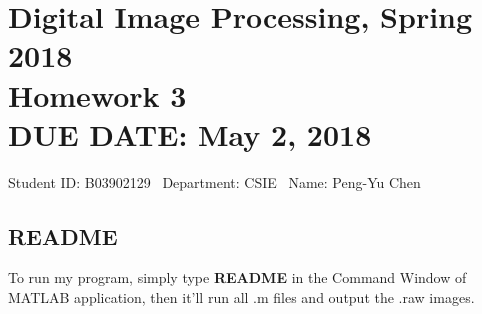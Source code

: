 \documentclass{article}
\newcommand{\hmwkClass}{Digital Image Processing, Spring 2018}
\newcommand{\hmwkTitle}{Homework 3}
\newcommand{\hmwkDueDate}{May 2, 2018}
\newcommand{\tb}{\textbf}
\begin{document}
\thispagestyle{empty}
\section*{\hmwkClass \\
    \normalsize{\hmwkTitle} \\
    \normalsize{DUE DATE: \hmwkDueDate}
}

\hfill{Student ID: B03902129 \, Department: CSIE \, Name: Peng-Yu Chen}

\subsection*{README}

To run my program, simply type \tb{README} in the Command Window of MATLAB application, then it'll run all .m files and output the .raw images.
\end{document}
